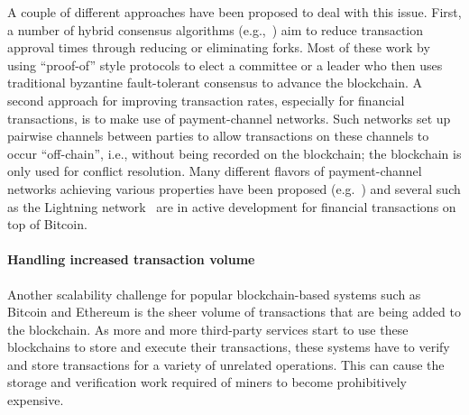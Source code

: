 A couple of different approaches have been proposed to deal with this issue.  First, a number of hybrid consensus algorithms (e.g.,~\cite{SOSP:GHMVZ17,OPODIS:AMNRS17,DISC:PasShi17,EC:PasShi18,NSDI:EGSR16}) aim to reduce transaction approval times through reducing or eliminating forks. Most of these work by using ``proof-of'' style protocols to elect a committee or a leader who then uses traditional byzantine fault-tolerant consensus to advance the blockchain.  A second approach for improving transaction rates, especially for financial transactions, is to make use of payment-channel networks. Such networks set up pairwise channels between parties to allow transactions on these channels to occur ``off-chain'', i.e., without being recorded on the blockchain; the blockchain is only used for conflict resolution.  Many different flavors of payment-channel networks achieving various properties have been proposed (e.g.~\cite{PooDry16, NDSS:HABSG17,CCS:KhaGer17,SYSTOR:LNEKPS18,CCS:MMKMR17,CCS:GreMie17}) and several such as the Lightning network~\cite{PooDry16} are in active development for financial transactions on top of Bitcoin.  

\paragraph{Handling increased transaction volume}
Another scalability challenge for popular blockchain-based systems such as Bitcoin and Ethereum is the sheer volume of transactions that are being added to the blockchain.  As more and more third-party services start to use these blockchains to store and execute their transactions, these systems have to verify and store transactions for a variety of unrelated operations. This can cause the storage and verification work required of miners to become prohibitively expensive.

